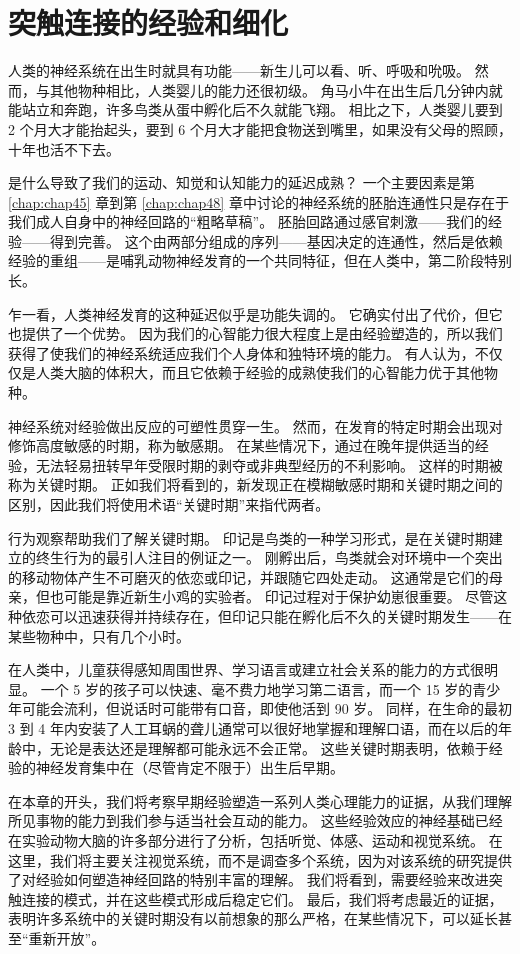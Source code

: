 \chapter{突触连接的经验和细化} \label{chap:chap49}
人类的神经系统在出生时就具有功能——新生儿可以看、听、呼吸和吮吸。 然而，与其他物种相比，人类婴儿的能力还很初级。 角马小牛在出生后几分钟内就能站立和奔跑，许多鸟类从蛋中孵化后不久就能飞翔。 相比之下，人类婴儿要到 2 个月大才能抬起头，要到 6 个月大才能把食物送到嘴里，如果没有父母的照顾，十年也活不下去。

是什么导致了我们的运动、知觉和认知能力的延迟成熟？ 一个主要因素是第 \ref{chap:chap45} 章到第 \ref{chap:chap48} 章中讨论的神经系统的胚胎连通性只是存在于我们成人自身中的神经回路的“粗略草稿”。 胚胎回路通过感官刺激——我们的经验——得到完善。 这个由两部分组成的序列——基因决定的连通性，然后是依赖经验的重组——是哺乳动物神经发育的一个共同特征，但在人类中，第二阶段特别长。

乍一看，人类神经发育的这种延迟似乎是功能失调的。 它确实付出了代价，但它也提供了一个优势。 因为我们的心智能力很大程度上是由经验塑造的，所以我们获得了使我们的神经系统适应我们个人身体和独特环境的能力。 有人认为，不仅仅是人类大脑的体积大，而且它依赖于经验的成熟使我们的心智能力优于其他物种。

神经系统对经验做出反应的可塑性贯穿一生。 然而，在发育的特定时期会出现对修饰高度敏感的时期，称为敏感期。 在某些情况下，通过在晚年提供适当的经验，无法轻易扭转早年受限时期的剥夺或非典型经历的不利影响。 这样的时期被称为关键时期。 正如我们将看到的，新发现正在模糊敏感时期和关键时期之间的区别，因此我们将使用术语“关键时期”来指代两者。

行为观察帮助我们了解关键时期。 印记是鸟类的一种学习形式，是在关键时期建立的终生行为的最引人注目的例证之一。 刚孵出后，鸟类就会对环境中一个突出的移动物体产生不可磨灭的依恋或印记，并跟随它四处走动。 这通常是它们的母亲，但也可能是靠近新生小鸡的实验者。 印记过程对于保护幼崽很重要。 尽管这种依恋可以迅速获得并持续存在，但印记只能在孵化后不久的关键时期发生——在某些物种中，只有几个小时。

在人类中，儿童获得感知周围世界、学习语言或建立社会关系的能力的方式很明显。 一个 5 岁的孩子可以快速、毫不费力地学习第二语言，而一个 15 岁的青少年可能会流利，但说话时可能带有口音，即使他活到 90 岁。 同样，在生命的最初 3 到 4 年内安装了人工耳蜗的聋儿通常可以很好地掌握和理解口语，而在以后的年龄中，无论是表达还是理解都可能永远不会正常。 这些关键时期表明，依赖于经验的神经发育集中在（尽管肯定不限于）出生后早期。

在本章的开头，我们将考察早期经验塑造一系列人类心理能力的证据，从我们理解所见事物的能力到我们参与适当社会互动的能力。 这些经验效应的神经基础已经在实验动物大脑的许多部分进行了分析，包括听觉、体感、运动和视觉系统。 在这里，我们将主要关注视觉系统，而不是调查多个系统，因为对该系统的研究提供了对经验如何塑造神经回路的特别丰富的理解。 我们将看到，需要经验来改进突触连接的模式，并在这些模式形成后稳定它们。 最后，我们将考虑最近的证据，表明许多系统中的关键时期没有以前想象的那么严格，在某些情况下，可以延长甚至“重新开放”。

